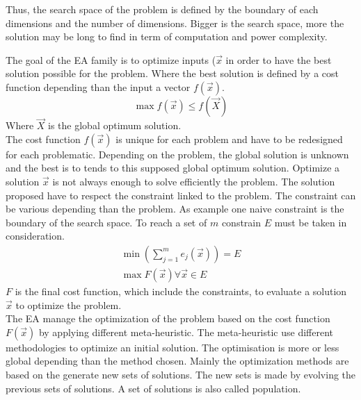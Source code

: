Thus, the search space of the problem is defined by the boundary of each dimensions and the number of dimensions.  
 Bigger is the search space, more the solution may be long to find in term of computation and power complexity.

 The goal of the EA family is to optimize inputs ($\vec{x}$ in order to have the best solution possible for the problem. Where the best solution is defined by a cost function depending than the input a vector $f(\vec{x})$. 
\begin{equation}
	\max f(\vec{x})\leq f(\vec{X})
\end{equation}
 Where  $\vec{X}$ is the global optimum solution. \\
 The cost function $f(\vec{x})$  is unique for each problem and have to be redesigned for  each problematic. 
Depending on the problem, the global solution is unknown and the best is to tends to this supposed global optimum solution. 
Optimize a solution $\vec{x}$ is not always enough to solve efficiently the problem. 
The solution proposed have to respect the constraint linked to the problem. The constraint can be various depending than the problem. As example one naive constraint is the boundary of the search space. To reach a set of $m$ constrain $E$ must be taken in consideration.
\begin{equation}
 \begin{split}
	\min (\sum^{m}_{j=1} e_j(\vec{x} ) )=E
    \\
	\max F(\vec{x}) \forall \vec{x} \in E 
  \end{split}
\end{equation}  
 $F$ is the final cost function, which include the constraints, to evaluate a solution $\vec{x}$ to optimize the problem. \\
The EA manage the optimization of the problem based on the cost function $F(\vec{x})$ by applying different meta-heuristic. 
The meta-heuristic use different methodologies to optimize an initial solution. The optimisation is more or less global depending than the method chosen. 
Mainly the optimization methods are based on the generate new sets of solutions. The new sets is made by evolving the previous sets of solutions. A set of solutions is also called population. %
